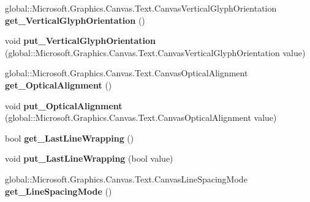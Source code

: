 \begin{DoxyCompactItemize}
global\+::\+Microsoft.\+Graphics.\+Canvas.\+Text.\+Canvas\+Vertical\+Glyph\+Orientation {\bfseries get\+\_\+\+Vertical\+Glyph\+Orientation} ()
\item 
\mbox{\label{interface_microsoft_1_1_graphics_1_1_canvas_1_1_text_1_1_i_canvas_text_format_a4f0382db5faf99e239642e76ec8e2269}} 
void {\bfseries put\+\_\+\+Vertical\+Glyph\+Orientation} (global\+::\+Microsoft.\+Graphics.\+Canvas.\+Text.\+Canvas\+Vertical\+Glyph\+Orientation value)
\item 
\mbox{\label{interface_microsoft_1_1_graphics_1_1_canvas_1_1_text_1_1_i_canvas_text_format_a6266ab0128ef88ed3a47c3b55f8d882a}} 
global\+::\+Microsoft.\+Graphics.\+Canvas.\+Text.\+Canvas\+Optical\+Alignment {\bfseries get\+\_\+\+Optical\+Alignment} ()
\item 
\mbox{\label{interface_microsoft_1_1_graphics_1_1_canvas_1_1_text_1_1_i_canvas_text_format_af5a78a267574fdae1a3a594f0d0e7d06}} 
void {\bfseries put\+\_\+\+Optical\+Alignment} (global\+::\+Microsoft.\+Graphics.\+Canvas.\+Text.\+Canvas\+Optical\+Alignment value)
\item 
\mbox{\label{interface_microsoft_1_1_graphics_1_1_canvas_1_1_text_1_1_i_canvas_text_format_adc2620964bc8e505aa61c08c6ac78893}} 
bool {\bfseries get\+\_\+\+Last\+Line\+Wrapping} ()
\item 
\mbox{\label{interface_microsoft_1_1_graphics_1_1_canvas_1_1_text_1_1_i_canvas_text_format_a3edf3bb3860fd65883e2b0a45e28b8b4}} 
void {\bfseries put\+\_\+\+Last\+Line\+Wrapping} (bool value)
\item 
\mbox{\label{interface_microsoft_1_1_graphics_1_1_canvas_1_1_text_1_1_i_canvas_text_format_ab83d69682b1282cc0203333291e4df42}} 
global\+::\+Microsoft.\+Graphics.\+Canvas.\+Text.\+Canvas\+Line\+Spacing\+Mode {\bfseries get\+\_\+\+Line\+Spacing\+Mode} ()
\item 

\end{DoxyCompactItemize}
